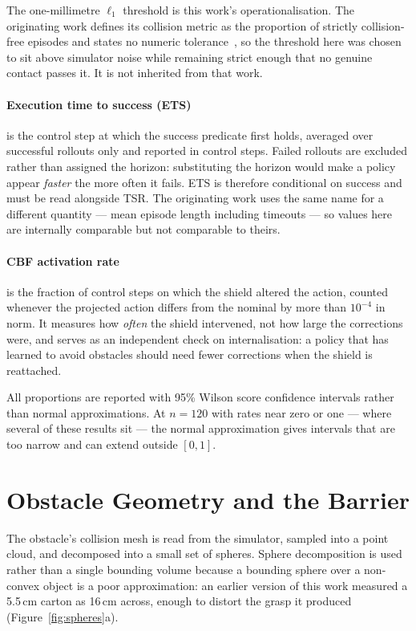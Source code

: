 \documentclass[a4paper,11pt]{report}
\begin{document}
The one-millimetre $\ell_1$ threshold is this work's operationalisation. The originating work
defines its collision metric as the proportion of strictly collision-free episodes and states no
numeric tolerance~\cite{vlsa2026}, so the threshold here was chosen to sit above simulator noise
while remaining strict enough that no genuine contact passes it. It is not inherited from that
work.

\paragraph{Execution time to success (ETS)} is the control step at which the success predicate
first holds, averaged over successful rollouts only and reported in control steps. Failed rollouts
are excluded rather than assigned the horizon: substituting the horizon would make a policy appear
\emph{faster} the more often it fails. ETS is therefore conditional on success and must be read
alongside TSR. The originating work uses the same name for a different quantity --- mean episode
length including timeouts --- so values here are internally comparable but not comparable to
theirs.

\paragraph{CBF activation rate} is the fraction of control steps on which the shield altered the
action, counted whenever the projected action differs from the nominal by more than $10^{-4}$ in
norm. It measures how \emph{often} the shield intervened, not how large the corrections were, and
serves as an independent check on internalisation: a policy that has learned to avoid obstacles
should need fewer corrections when the shield is reattached.

All proportions are reported with 95\% Wilson score confidence intervals rather than normal
approximations. At $n = 120$ with rates near zero or one --- where several of these results sit ---
the normal approximation gives intervals that are too narrow and can extend outside $[0,1]$.

\section{Obstacle Geometry and the Barrier}\label{sec:barrier}

The obstacle's collision mesh is read from the simulator, sampled into a point cloud, and decomposed
into a small set of spheres. Sphere decomposition is used rather than a single bounding volume
because a bounding sphere over a non-convex object is a poor approximation: an earlier version of
this work measured a 5.5\,cm carton as 16\,cm across, enough to distort the grasp it produced
(Figure~\ref{fig:spheres}a).
\end{document}
